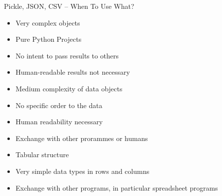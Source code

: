\begin{frame}[fragile]{Pickle, JSON, CSV -- When To Use What?}
%
\begin{tcbraster}[raster columns=3,
                  raster equal height,
                  nobeforeafter,
                  raster column skip=0.2cm]
\begin{tcolorbox}[title=Pickle]

\vspace{-1pt}
\begin{itemize}
\item Very complex objects
\item Pure Python Projects
\item No intent to pass results to others
\item Human-readable results not necessary
\end{itemize}
\end{tcolorbox}
%
\begin{tcolorbox}[title=JSON]

\vspace{-1pt}
\begin{itemize}
\item Medium complexity of data objects
\item No specific order to the data
\item Human readability necessary
\item Exchange with other prorammes or humans
\end{itemize}
\end{tcolorbox}
%
\begin{tcolorbox}[title=CSV]

\vspace{-1pt}
\begin{itemize}
\item Tabular structure
\item Very simple data types in rows and columns
\item Exchange with other programs, in particular spreadsheet programs
\end{itemize}
\end{tcolorbox}
\end{tcbraster}
%
\end{frame}